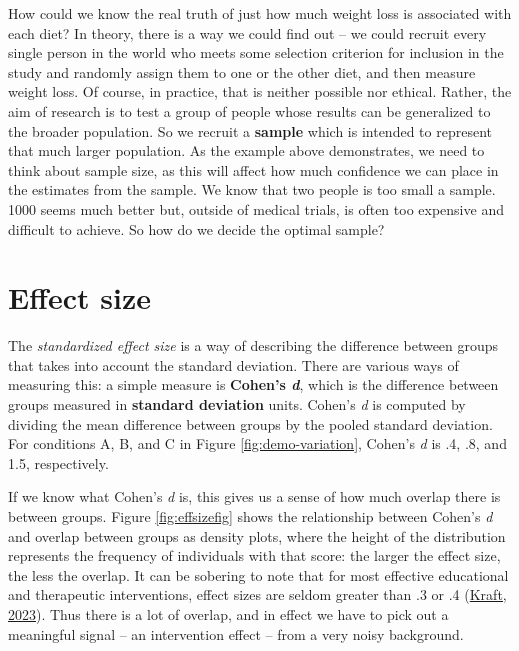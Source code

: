 \documentclass{krantz}
\begin{document}
How could we know the real truth of just how much weight loss is associated with each diet? In theory, there is a way we could find out -- we could recruit every single person in the world who meets some selection criterion for inclusion in the study and randomly assign them to one or the other diet, and then measure weight loss. Of course, in practice, that is neither possible nor ethical. Rather, the aim of research is to test a group of people whose results can be generalized to the broader population. So we recruit a \textbf{sample} which is intended to represent that much larger population. As the example above demonstrates, we need to think about sample size, as this will affect how much confidence we can place in the estimates from the sample. We know that two people is too small a sample. 1000 seems much better but, outside of medical trials, is often too expensive and difficult to achieve. So how do we decide the optimal sample?

\hypertarget{effect-size}{%
\section{Effect size}\label{effect-size}}

The \emph{standardized effect size}  is a way of describing the difference between groups that takes into account the standard deviation. There are various ways of measuring this: a simple measure is \textbf{Cohen's \emph{d}}, which is the difference between groups measured in \textbf{standard deviation} units. Cohen's \emph{d} is computed by dividing the mean difference between groups by the pooled standard deviation. For conditions A, B, and C in Figure \ref{fig:demo-variation}, Cohen's \emph{d} is .4, .8, and 1.5, respectively.

If we know what Cohen's \emph{d} is, this gives us a sense of how much overlap there is between groups. Figure \ref{fig:effsizefig} shows the relationship between Cohen's \emph{d} and overlap between groups as density plots, where the height of the distribution represents the frequency of individuals with that score: the larger the effect size, the less the overlap. It can be sobering to note that for most effective educational and therapeutic interventions, effect sizes are seldom greater than .3 or .4 (\protect\hyperlink{ref-kraft2023}{Kraft, 2023}). Thus there is a lot of overlap, and in effect we have to pick out a meaningful signal -- an intervention effect -- from a very noisy background.
\end{document}
